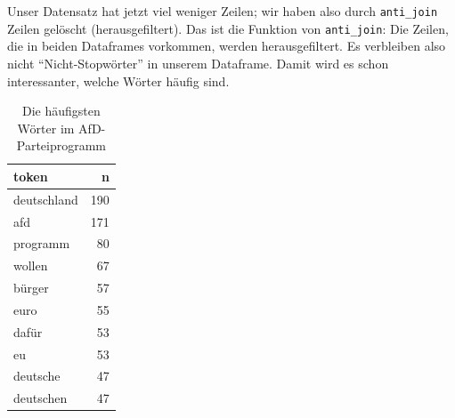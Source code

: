 \documentclass[12pt,ngerman,]{book}
\makeatletter
\newenvironment{Shaded}{\begin{snugshade}}{\end{snugshade}}
\newcommand{\KeywordTok}[1]{\textcolor[rgb]{0.13,0.29,0.53}{\textbf{#1}}}
\newcommand{\DataTypeTok}[1]{\textcolor[rgb]{0.13,0.29,0.53}{#1}}
\newcommand{\StringTok}[1]{\textcolor[rgb]{0.31,0.60,0.02}{#1}}
\newcommand{\CommentTok}[1]{\textcolor[rgb]{0.56,0.35,0.01}{\textit{#1}}}
\newcommand{\OtherTok}[1]{\textcolor[rgb]{0.56,0.35,0.01}{#1}}
\newcommand{\OperatorTok}[1]{\textcolor[rgb]{0.81,0.36,0.00}{\textbf{#1}}}
\newcommand{\NormalTok}[1]{#1}
\newenvironment{kframe}{%
\medskip{}
\setlength{\fboxsep}{.8em}
 \def\at@end@of@kframe{}%
 \ifinner\ifhmode%
  \def\at@end@of@kframe{\end{minipage}}%
  \begin{minipage}{\columnwidth}%
 \fi\fi%
 \def\FrameCommand##1{\hskip\@totalleftmargin \hskip-\fboxsep
 \colorbox{shadecolor}{##1}\hskip-\fboxsep
     \hskip-\linewidth \hskip-\@totalleftmargin \hskip\columnwidth}%
 \MakeFramed {\advance\hsize-\width
   \@totalleftmargin\z@ \linewidth\hsize
   \@setminipage}}%
 {\par\unskip\endMakeFramed%
 \at@end@of@kframe}
\renewenvironment{Shaded}{\begin{kframe}}{\end{kframe}}
\theoremstyle{definition}
\theoremstyle{definition}
\theoremstyle{remark}
\makeatother
\begin{document}
\begin{Shaded}
\end{Shaded}

Unser Datensatz hat jetzt viel weniger Zeilen; wir haben also durch
\texttt{anti\_join} Zeilen gelöscht (herausgefiltert). Das ist die
Funktion von \texttt{anti\_join}: Die Zeilen, die in beiden Dataframes
vorkommen, werden herausgefiltert. Es verbleiben also nicht
``Nicht-Stopwörter'' in unserem Dataframe. Damit wird es schon
interessanter, welche Wörter häufig sind.

\begin{Shaded}
\end{Shaded}

\begin{table}

\caption{\label{tab:unnamed-chunk-19}Die häufigsten Wörter im AfD-Parteiprogramm}
\centering
\begin{tabular}[t]{l|r}
\hline
token & n\\
\hline
deutschland & 190\\
\hline
afd & 171\\
\hline
programm & 80\\
\hline
wollen & 67\\
\hline
bürger & 57\\
\hline
euro & 55\\
\hline
dafür & 53\\
\hline
eu & 53\\
\hline
deutsche & 47\\
\hline
deutschen & 47\\
\hline
\end{tabular}
\end{table}
\end{document}
